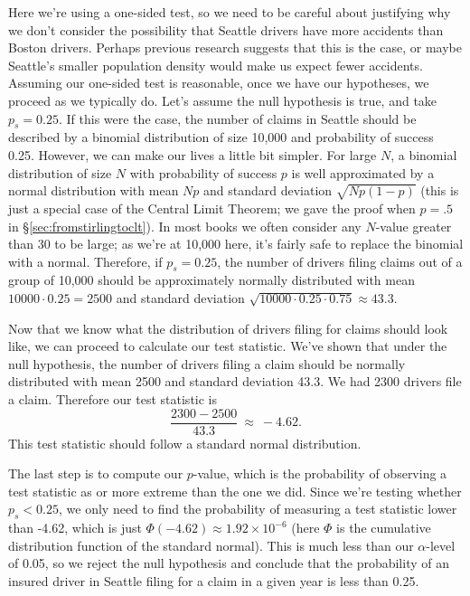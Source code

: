 Here we're using a one-sided test, so we need to be careful about justifying why we don't consider the possibility that Seattle drivers have more accidents than Boston drivers.  Perhaps previous research suggests that this is the case, or maybe Seattle's smaller population density would make us expect fewer accidents.  Assuming our one-sided test is reasonable, once we have our hypotheses, we proceed as we typically do.  Let's assume the null hypothesis is true, and take $p_s = 0.25$.  If this were the case, the number of claims in Seattle should be described by a binomial distribution of size 10,000 and probability of success 0.25.  However, we can make our lives a little bit simpler.  For large $N$, a binomial distribution of size $N$ with probability of success $p$ is well approximated by a normal distribution with mean $Np$ and standard deviation $\sqrt{Np(1-p)}$ (this is just a special case of the Central Limit Theorem; we gave the proof when $p = .5$ in \S\ref{sec:fromstirlingtoclt}). In most books we often consider any $N$-value greater than 30 to be large; as we're at 10,000 here, it's fairly safe to replace the binomial with a normal. Therefore, if $p_s = 0.25$, the number of drivers filing claims out of a group of 10,000 should be approximately normally distributed with mean $10000 \cdot 0.25 = 2500$ and standard deviation $\sqrt{10000 \cdot 0.25 \cdot 0.75} \approx 43.3$.

Now that we know what the distribution of drivers filing for claims should look like, we can proceed to calculate our test statistic.  We've shown that under the null hypothesis, the number of drivers filing a claim should be normally distributed with mean 2500 and standard deviation 43.3.  We had 2300 drivers file a claim.  Therefore our test statistic is
\begin{equation*}
\frac{2300-2500}{43.3}\ \approx \  -4.62.
\end{equation*}
This test statistic should follow a standard normal distribution.

The last step is to compute our $p$-value, which is the probability of observing a test statistic as or more extreme than the one we did.  Since we're testing whether $p_s < 0.25$, we only need to find the probability of measuring a test statistic lower than -4.62, which is just $\Phi(-4.62)\approx 1.92\times 10^{-6}$ (here $\Phi$ is the cumulative distribution function of the standard normal).  This is much less than our $\alpha$-level of 0.05, so we reject the null hypothesis and conclude that the probability of an insured driver in Seattle filing for a claim in a given year is less than 0.25.


